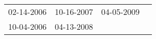 \begin{supertabular}{llll}
 02-14-2006 &  10-16-2007 &  04-05-2009 \\
 10-04-2006 &  04-13-2008 &             \\
\end{supertabular}

